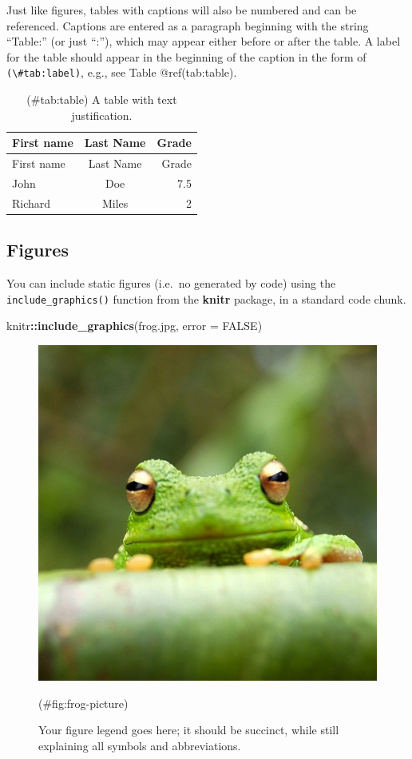 \documentclass[9pt,a4paper,]{extarticle}
\newenvironment{Shaded}{\begin{snugshade}}{\end{snugshade}}
\newcommand{\AttributeTok}[1]{\textcolor[rgb]{0.13,0.29,0.53}{#1}}
\newcommand{\ConstantTok}[1]{\textcolor[rgb]{0.56,0.35,0.01}{#1}}
\newcommand{\FunctionTok}[1]{\textcolor[rgb]{0.13,0.29,0.53}{\textbf{#1}}}
\newcommand{\NormalTok}[1]{#1}
\newcommand{\SpecialCharTok}[1]{\textcolor[rgb]{0.81,0.36,0.00}{\textbf{#1}}}
\newcommand{\StringTok}[1]{\textcolor[rgb]{0.31,0.60,0.02}{#1}}
\begin{document}
Just like figures, tables with captions will also be numbered and can be referenced. Captions are entered as a paragraph beginning with the string ``Table:'' (or just ``:''), which may appear either before or after the table. A label for the table should appear in the beginning of the caption in the form of \texttt{(\textbackslash{}\#tab:label)}, e.g., see Table @ref(tab:table).

\begin{longtable}[]{@{}lcr@{}}
\caption{(\#tab:table) A table with text justification.}\tabularnewline
\toprule\noalign{}
First name & Last Name & Grade \\
\midrule\noalign{}
\endfirsthead
\toprule\noalign{}
First name & Last Name & Grade \\
\midrule\noalign{}
\endhead
\bottomrule\noalign{}
\endlastfoot
John & Doe & 7.5 \\
Richard & Miles & 2 \\
\end{longtable}

\hypertarget{figures}{%
\subsection{Figures}\label{figures}}

You can include static figures (i.e.~no generated by code) using the \texttt{include\_graphics()} function from the \textbf{knitr} package, in a standard code chunk.

\begin{Shaded}
\begin{Highlighting}[]
\NormalTok{knitr}\SpecialCharTok{::}\FunctionTok{include\_graphics}\NormalTok{(}\StringTok{\textquotesingle{}frog.jpg\textquotesingle{}}\NormalTok{, }\AttributeTok{error =} \ConstantTok{FALSE}\NormalTok{)}
\end{Highlighting}
\end{Shaded}

\begin{figure}

{\centering \includegraphics[width=0.5\linewidth]{frog} 

}

\caption{Your figure legend goes here; it should be succinct, while still explaining all symbols and abbreviations.}(\#fig:frog-picture)
\end{figure}
\end{document}
